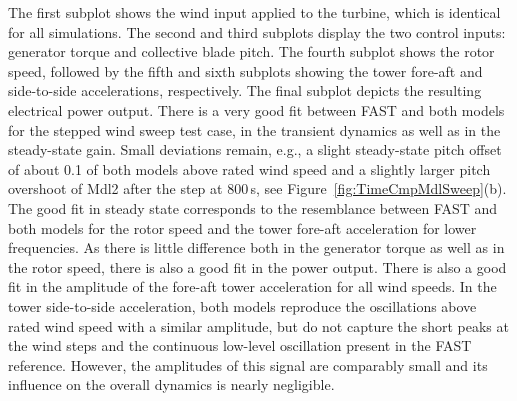 %


The first subplot shows the wind input applied to the turbine, which is identical for all simulations. The second and third subplots display the two control inputs: generator torque and collective blade pitch. The fourth subplot shows the rotor speed, followed by the fifth and sixth subplots showing the tower fore-aft and side-to-side accelerations, respectively. The final subplot depicts the resulting electrical power output. There is a very good fit between FAST and both models for the stepped wind sweep test case, in the transient dynamics as well as in the steady-state gain. Small deviations remain, e.g., a slight steady-state pitch offset of about 0.1\textdegree{} of both models above rated wind speed and a slightly larger pitch overshoot of Mdl2 after the step at 800\,s, see Figure~\ref{fig:TimeCmpMdlSweep}(b). The good fit in steady state corresponds to the resemblance between FAST and both models for the rotor speed and the tower fore-aft acceleration for lower frequencies. As there is little difference both in the generator torque as well as in the rotor speed, there is also a good fit in the power output. There is also a good fit in the amplitude of the fore-aft tower acceleration for all wind speeds. In the tower side-to-side acceleration, both models reproduce the oscillations above rated wind speed with a similar amplitude, but do not capture the short peaks at the wind steps and the continuous low-level oscillation present in the FAST reference. However, the amplitudes of this signal are comparably small and its influence on the overall dynamics is nearly negligible.

